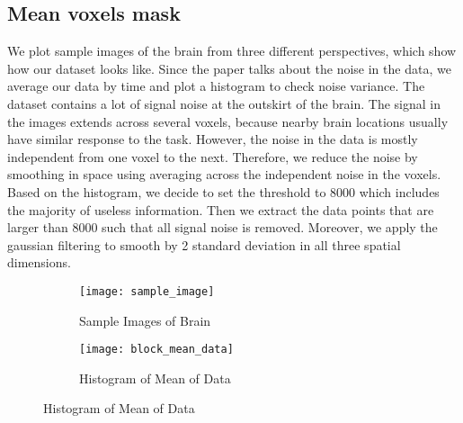 \subsection{Mean voxels mask}

We plot sample images of the brain from three different perspectives, which 
show how our dataset looks like. Since the paper talks about the noise 
in the data, we average our data by time and plot a histogram to check noise 
variance. The dataset contains a lot of signal noise at the outskirt of the 
brain. The signal in the images extends across several voxels, because nearby 
brain locations usually have similar response to the task. However, the noise 
in the data is mostly independent from one voxel to the next. Therefore, we 
reduce the noise by smoothing in space using averaging across the independent 
noise in the voxels. Based on the histogram, we decide to set the threshold to 
8000 which includes the majority of useless information. Then we extract the data 
points that are larger than 8000 such that all signal noise is removed. Moreover, 
we apply the gaussian filtering to smooth by 2 standard deviation in all three spatial 
dimensions.

\begin{figure}[h]
\centering
\begin{subfigure}{.45\textwidth}
  \texttt{[image: sample\_image]}
  \caption{Sample Images of Brain}
  \label{fig:sub1}
\end{subfigure}%
\begin{subfigure}{.6\textwidth}
  \texttt{[image: block\_mean\_data]}
  \centering
  \caption{Histogram of Mean of Data}
  \label{fig:sub2}
\end{subfigure}
\end{figure}


